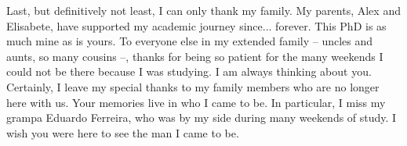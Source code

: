 \documentclass[12pt,twoside,brazilian,english]{book}
\begin{document}
Last, but definitively not least, I can only thank my family.
My parents, Alex and Elisabete, have supported my academic journey since...
forever. This PhD is as much mine as is yours. To everyone else in my
extended family -- uncles and aunts, so many cousins --, thanks for
being so patient for the many weekends I could not be there because
I was studying. I am always thinking about you. Certainly, I leave
my special thanks to my family members who are no longer here with us.
Your memories live in who I came to be. In particular, I miss my grampa
Eduardo Ferreira, who was by my side during many weekends of study.
I wish you were here to see the man I came to be.






\makeatletter
\if@openright\cleardoublepage\else\clearpage\fi
\makeatother


\newcommand\disablenewpage[1]{{\let\clearpage\par\let\cleardoublepage\par #1}}
\end{document}

